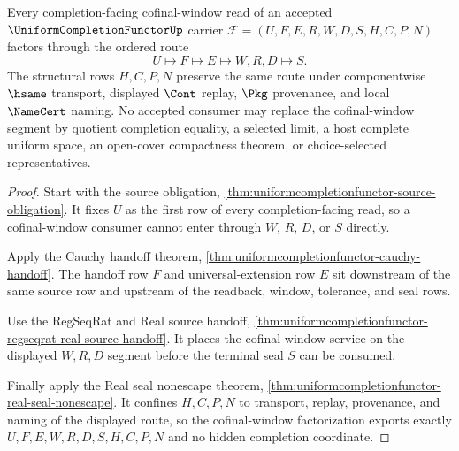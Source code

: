 \begin{theorem}
\label{thm:uniform-completion-functor-cofinal-window-factorization}
Every completion-facing cofinal-window read of an accepted $\UniformCompletionFunctorUp$ carrier $\mathcal{F}=(U,F,E,R,W,D,S,H,C,P,N)$ factors through the ordered route
$$
U \longmapsto F \longmapsto E \longmapsto W,R,D \longmapsto S.
$$
The structural rows $H,C,P,N$ preserve the same route under componentwise $\hsame$ transport, displayed $\Cont$ replay, $\Pkg$ provenance, and local $\NameCert$ naming. No accepted consumer may replace the cofinal-window segment by quotient completion equality, a selected limit, a host complete uniform space, an open-cover compactness theorem, or choice-selected representatives.
\end{theorem}
\begin{proof}
Start with the source obligation, \autoref{thm:uniformcompletionfunctor-source-obligation}. It fixes $U$ as the first row of every completion-facing read, so a cofinal-window consumer cannot enter through $W$, $R$, $D$, or $S$ directly.

Apply the Cauchy handoff theorem, \autoref{thm:uniformcompletionfunctor-cauchy-handoff}. The handoff row $F$ and universal-extension row $E$ sit downstream of the same source row and upstream of the readback, window, tolerance, and seal rows.

Use the RegSeqRat and Real source handoff, \autoref{thm:uniformcompletionfunctor-regseqrat-real-source-handoff}. It places the cofinal-window service on the displayed $W,R,D$ segment before the terminal seal $S$ can be consumed.

Finally apply the Real seal nonescape theorem, \autoref{thm:uniformcompletionfunctor-real-seal-nonescape}. It confines $H,C,P,N$ to transport, replay, provenance, and naming of the displayed route, so the cofinal-window factorization exports exactly $U,F,E,W,R,D,S,H,C,P,N$ and no hidden completion coordinate.
\end{proof}

